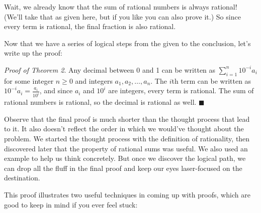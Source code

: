 \documentclass[11pt]{article}
\begin{document}
    Wait, we already know that the sum of rational numbers is always rational! (We'll take
    that as given here, but if you like you can also prove it.) So since every term is
    rational, the final fraction is also rational.
    
    Now that we have a series of logical steps from the given to the conclusion, let's
    write up the proof:
    
    \textit{Proof of Theorem 2}. Any decimal between 0 and 1 can be written as
    $\displaystyle\sum_{i=1}^{n}10^{-i}a_i$ for some integer $n\geq0$ and integers
    $a_{1},a_{2},\dots,a_{n}$. The $i$th term can be written as
    $10^{-i}a_i=\frac{a_i}{10^{i}}$, and since $a_i$ and $10^{i}$ are integers, every
    term is rational. The sum of rational numbers is rational, so the decimal is
    rational as well. $\blacksquare$
    
    Observe that the final proof is much shorter than the thought process that lead to it.
    It also doesn't reflect the order in which we would've thought about the problem.
    We started the thought process with the definition of rationality, then discovered later
    that the property of rational sums was useful. We also used an example to help us think
    concretely. But once we discover the logical path, we can drop all the fluff in the final
    proof and keep our eyes laser-focused on the destination.
    
    This proof illustrates two useful techniques in coming up with proofs, which are
    good to keep in mind if you ever feel stuck:
    
\end{document}
